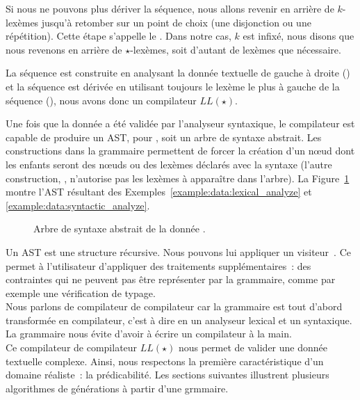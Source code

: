 Si nous ne pouvons plus dériver la séquence, nous allons revenir en arrière de
$k$-lexèmes jusqu'à retomber sur un point de choix (une disjonction ou une
répétition). Cette étape s'appelle le . Dans notre cas,
$k$ est infixé, nous disons que nous revenons en arrière de $\star$-lexèmes,
soit d'autant de lexèmes que nécessaire.

La séquence est construite en analysant la donnée textuelle de gauche à droite
() et la séquence est dérivée en utilisant
toujours le lexème le plus à gauche de la séquence (), nous avons donc un compilateur $LL(\star)$.

Une fois que la donnée a été validée par l'analyseur syntaxique, le compilateur
est capable de produire un AST, pour , soit un
arbre de syntaxe abstrait. Les constructions  dans la grammaire
permettent de forcer la création d'un nœud dont les enfants seront des nœuds ou
des lexèmes déclarés avec la syntaxe  (l'autre construction,
, n'autorise pas les lexèmes à apparaître dans l'arbre). La
Figure~\ref{figure:data:ast} montre l'AST résultant des
Exemples~\ref{example:data:lexical_analyze} et
\ref{example:data:syntactic_analyze}.
%
\begin{figure}


\caption{\label{figure:data:ast} Arbre de syntaxe abstrait de la donnée .}

\end{figure}
%
Un AST est une structure récursive. Nous pouvons lui appliquer un {\strong
visiteur}~. Ce  permet à
l'utilisateur d'appliquer des traitements supplémentaires~: des contraintes qui
ne peuvent pas être représenter par la grammaire, comme par exemple une
vérification de typage. \\

Nous parlons de {\strong compilateur de compilateur} car la grammaire est tout
d'abord transformée en compilateur, c'est à dire en un analyseur lexical et un
syntaxique. La grammaire nous évite d'avoir à écrire un compilateur à la main. \\

Ce compilateur de compilateur $LL(\star)$ nous permet de valider une donnée
textuelle complexe. Ainsi, nous respectons la première caractéristique d'un
domaine réaliste~: la prédicabilité. Les sections suivantes illustrent plusieurs
algorithmes de générations à partir d'une grmmaire.

